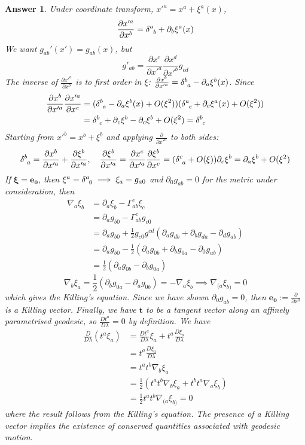 \documentclass[a4paper]{article}
\theoremstyle{new2}
\newtheorem{ans}{Answer}[section]
\theoremstyle{new}
\begin{document}
\begin{ans}
Under coordinate transform, $x'^a=x^a+\xi^a(x)$,
$$\frac{\partial x'^a}{\partial x^b}=\tensor*{\delta}{*_{}^{a}_{b}}+\partial_b\xi^a(x)$$
We want $g_{ab}'(x')=g_{ab}(x)$, but
$$g'_{ab}=\frac{\partial x^c}{\partial x'^a}\frac{\partial x^d}{\partial x'^b}g_{cd}$$
The inverse of $\frac{\partial x'^a}{\partial x^b}$ is to first order in $\xi$: $\frac{\partial x^b}{\partial x'^a}=\tensor*{\delta}{*_{}^{b}_{a}}-\partial_a\xi^b(x)$. Since
\begin{align}
\frac{\partial x^b}{\partial x'^a}\frac{\partial x'^a}{\partial x^c}&=(\tensor*{\delta}{*_{}^{b}_{a}}-\partial_a\xi^b(x)+O(\xi^2))(\tensor*{\delta}{*_{}^{a}_{c}}+\partial_c\xi^a(x)+O(\xi^2))\nonumber\\&=\tensor*{\delta}{*_{}^{b}_{c}}+\partial_c\xi^b-\partial_c\xi^b+O(\xi^2)=\tensor*{\delta}{*_{}^{b}_{c}}\nonumber
\end{align}
Starting from $x'^b=x^b+\xi^b$ and applying $\frac{\partial}{\partial x'^a}$ to both sides:
$$\tensor*{\delta}{*_{}^{b}_{a}}=\frac{\partial x^b}{\partial x'^a}+\frac{\partial\xi^b}{\partial x'^a},\quad\frac{\partial\xi^b}{\partial x'^a}=\frac{\partial x^c}{\partial x'^a}\frac{\partial\xi^b}{\partial x^c}=(\tensor*{\delta}{*_{}^{c}_{a}}+O(\xi))\partial_c\xi^b=\partial_a\xi^b+O(\xi^2)$$
If $\boldsymbol{\xi}=\boldsymbol{e_0}$, then $\xi^a=\tensor*{\delta}{*_{}^{a}_{0}}\implies\xi_a=g_{a0}$ and $\partial_0g_{ab}=0$ for the metric under consideration, then
\begin{align}
    \nabla_a\xi_b&=\partial_a\xi_b-\Gamma^c_{ab}\xi_c\nonumber\\&=\partial_ag_{b0}-\Gamma^c_{ab}g_{c0}\nonumber\\&=\partial_ag_{b0}+\frac{1}{2}g_{c0}g^{cd}(\partial_ag_{db}+\partial_bg_{da}-\partial_dg_{ab})\nonumber\\&=\partial_ag_{b0}-\frac{1}{2}(\partial_ag_{0b}+\partial_bg_{0a}-\partial_0g_{ab})\nonumber\\&=\frac{1}{2}(\partial_ag_{0b}-\partial_bg_{0a})\nonumber
\end{align}
$$\nabla_b\xi_a=\frac{1}{2}(\partial_bg_{0a}-\partial_ag_{0b})=-\nabla_a\xi_b\implies\nabla_{(a}\xi_{b)}=0$$
which gives the Killing's equation. Since we have shown $\partial_0g_{ab}=0$, then $\boldsymbol{e_0}:=\frac{\partial}{\partial x^0}$ is a Killing vector. Finally, we have $\boldsymbol{t}$ to be a tangent vector along an affinely parametrised geodesic, so $\frac{Dt^a}{D\lambda}=0$ by definition. We have 
\begin{align}
    \frac{D}{D\lambda}(t^a\xi_a)&=\frac{Dt^a}{D\lambda}\xi_a+t^a\frac{D\xi_a}{D\lambda}\nonumber\\&=t^a\frac{D\xi_a}{D\lambda}\nonumber\\&=t^at^b\nabla_b\xi_a\nonumber\\&=\frac{1}{2}(t^at^b\nabla_b\xi_a+t^bt^a\nabla_a\xi_b)\nonumber\\&=\frac{1}{2}t^at^b\nabla_{(a}\xi_{b)}=0\nonumber
\end{align}
where the result follows from the Killing's equation. The presence of a Killing vector implies the existence of conserved quantities associated with geodesic motion.
\end{ans}
\newpage
\end{document}
